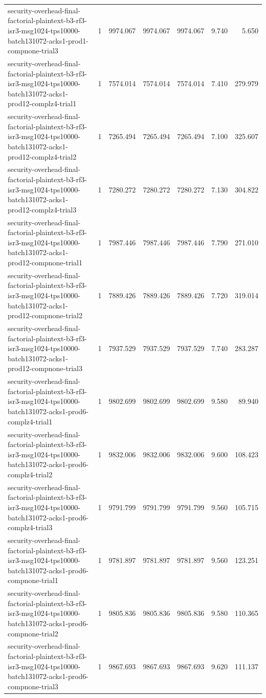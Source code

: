 \begin{tabular}{lrrrrrr}
security-overhead-final-factorial-plaintext-b3-rf3-isr3-msg1024-tps10000-batch131072-acks1-prod1-compnone-trial3 & 1 & 9974.067 & 9974.067 & 9974.067 & 9.740 & 5.650 \\
security-overhead-final-factorial-plaintext-b3-rf3-isr3-msg1024-tps10000-batch131072-acks1-prod12-complz4-trial1 & 1 & 7574.014 & 7574.014 & 7574.014 & 7.410 & 279.979 \\
security-overhead-final-factorial-plaintext-b3-rf3-isr3-msg1024-tps10000-batch131072-acks1-prod12-complz4-trial2 & 1 & 7265.494 & 7265.494 & 7265.494 & 7.100 & 325.607 \\
security-overhead-final-factorial-plaintext-b3-rf3-isr3-msg1024-tps10000-batch131072-acks1-prod12-complz4-trial3 & 1 & 7280.272 & 7280.272 & 7280.272 & 7.130 & 304.822 \\
security-overhead-final-factorial-plaintext-b3-rf3-isr3-msg1024-tps10000-batch131072-acks1-prod12-compnone-trial1 & 1 & 7987.446 & 7987.446 & 7987.446 & 7.790 & 271.010 \\
security-overhead-final-factorial-plaintext-b3-rf3-isr3-msg1024-tps10000-batch131072-acks1-prod12-compnone-trial2 & 1 & 7889.426 & 7889.426 & 7889.426 & 7.720 & 319.014 \\
security-overhead-final-factorial-plaintext-b3-rf3-isr3-msg1024-tps10000-batch131072-acks1-prod12-compnone-trial3 & 1 & 7937.529 & 7937.529 & 7937.529 & 7.740 & 283.287 \\
security-overhead-final-factorial-plaintext-b3-rf3-isr3-msg1024-tps10000-batch131072-acks1-prod6-complz4-trial1 & 1 & 9802.699 & 9802.699 & 9802.699 & 9.580 & 89.940 \\
security-overhead-final-factorial-plaintext-b3-rf3-isr3-msg1024-tps10000-batch131072-acks1-prod6-complz4-trial2 & 1 & 9832.006 & 9832.006 & 9832.006 & 9.600 & 108.423 \\
security-overhead-final-factorial-plaintext-b3-rf3-isr3-msg1024-tps10000-batch131072-acks1-prod6-complz4-trial3 & 1 & 9791.799 & 9791.799 & 9791.799 & 9.560 & 105.715 \\
security-overhead-final-factorial-plaintext-b3-rf3-isr3-msg1024-tps10000-batch131072-acks1-prod6-compnone-trial1 & 1 & 9781.897 & 9781.897 & 9781.897 & 9.560 & 123.251 \\
security-overhead-final-factorial-plaintext-b3-rf3-isr3-msg1024-tps10000-batch131072-acks1-prod6-compnone-trial2 & 1 & 9805.836 & 9805.836 & 9805.836 & 9.580 & 110.365 \\
security-overhead-final-factorial-plaintext-b3-rf3-isr3-msg1024-tps10000-batch131072-acks1-prod6-compnone-trial3 & 1 & 9867.693 & 9867.693 & 9867.693 & 9.620 & 111.137 \\

\end{tabular}
